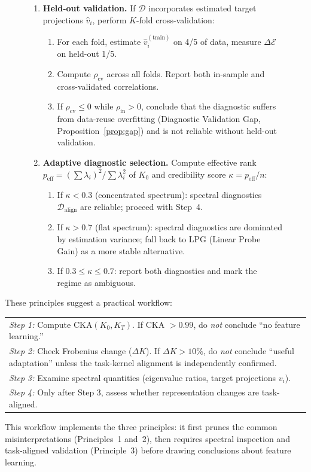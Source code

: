 \documentclass[10pt]{article}
\begin{document}
\begin{figure}[t]
\begin{enumerate}
    \item \textbf{Held-out validation.}
    If $\mathcal{D}$ incorporates estimated target projections $\hat{v}_i$, perform $K$-fold cross-validation:
    \begin{enumerate}
        \item For each fold, estimate $\hat{v}_i^{(\text{train})}$ on 4/5 of data, measure $\Delta\mathcal{E}$ on held-out 1/5.
        \item Compute $\rho_{\text{cv}}$ across all folds.  Report both in-sample and cross-validated correlations.
        \item If $\rho_{\text{cv}} \leq 0$ while $\rho_{\text{in}} > 0$, conclude that the diagnostic suffers from data-reuse overfitting (Diagnostic Validation Gap, Proposition~\ref{prop:gap}) and is not reliable without held-out validation.
    \end{enumerate}
    \item \textbf{Adaptive diagnostic selection.}
    Compute effective rank $p_{\text{eff}} = (\sum \lambda_i)^2 / \sum \lambda_i^2$ of $K_0$ and credibility score $\kappa = p_{\text{eff}} / n$:
    \begin{enumerate}
        \item If $\kappa < 0.3$ (concentrated spectrum): spectral diagnostics $\mathcal{D}_{\text{align}}$ are reliable; proceed with Step~4.
        \item If $\kappa > 0.7$ (flat spectrum): spectral diagnostics are dominated by estimation variance; fall back to LPG (Linear Probe Gain) as a more stable alternative.
        \item If $0.3 \leq \kappa \leq 0.7$: report both diagnostics and mark the regime as ambiguous.
    \end{enumerate}
\end{enumerate}
\end{figure}

These principles suggest a practical workflow:
\begin{center}
\small
\begin{tabular}{p{}}
\emph{Step 1:} Compute CKA$(K_0, K_T)$. If CKA $> 0.99$, do \emph{not} conclude ``no feature learning.'' \\
\emph{Step 2:} Check Frobenius change ($\Delta K$). If $\Delta K > 10\%$, do \emph{not} conclude ``useful adaptation'' unless the task-kernel alignment is independently confirmed. \\
\emph{Step 3:} Examine spectral quantities (eigenvalue ratios, target projections $v_i$). \\
\emph{Step 4:} Only after Step 3, assess whether representation changes are task-aligned.
\end{tabular}
\end{center}
This workflow implements the three principles: it first prunes the common misinterpretations (Principles~1 and~2), then requires spectral inspection and task-aligned validation (Principle~3) before drawing conclusions about feature learning.
\end{document}
